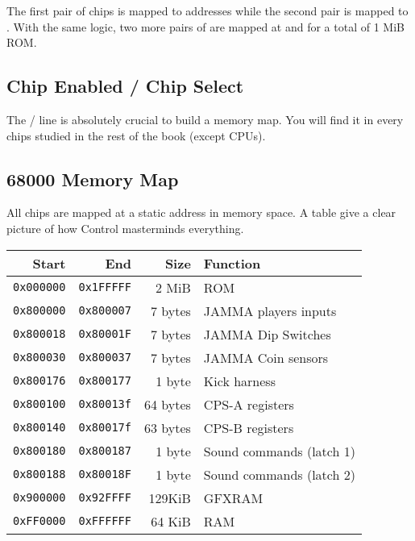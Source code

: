 The first pair of chips is mapped to addresses  while the second pair is mapped to . With the same logic, two more pairs of  are mapped at  and  for a total of 1 MiB ROM.


\subsection{Chip Enabled / Chip Select}

The  /  line is absolutely crucial to build a memory map. You will find it in every chips studied in the rest of the book (except CPUs).

\subsection{68000 Memory Map}

All chips are mapped at a static address in memory space. A table give a clear picture of how Control masterminds everything.

\begin{tabularx}{\textwidth}{rrrX}
\toprule    
  \textbf{Start } & \textbf{End  } & \textbf{Size } & \textbf{Function } \\               
  \toprule    
  \texttt{0x000000} & \texttt{0x1FFFFF} & 2 MiB & ROM \\
  \toprule    
  \texttt{0x800000} & \texttt{0x800007} & 7 bytes & JAMMA players inputs \\
  \texttt{0x800018} & \texttt{0x80001F} & 7 bytes & JAMMA Dip Switches \\
  \texttt{0x800030} & \texttt{0x800037} & 7 bytes & JAMMA Coin sensors \\
  \texttt{0x800176} & \texttt{0x800177} & 1 byte & Kick harness \\
\toprule    
  \texttt{0x800100} & \texttt{0x80013f} & 64 bytes & CPS-A registers\\
  \texttt{0x800140} & \texttt{0x80017f} & 63 bytes & CPS-B registers\\
\toprule    
  \texttt{0x800180} & \texttt{0x800187} & 1 byte & Sound commands (latch 1)\\
  \texttt{0x800188} & \texttt{0x80018F} & 1 byte & Sound commands (latch 2)\\
  \toprule    
  \texttt{0x900000} & \texttt{0x92FFFF} & 129KiB & GFXRAM\\
  \texttt{0xFF0000} & \texttt{0xFFFFFF} & 64 KiB & RAM \\
  \toprule    
\end{tabularx}%

